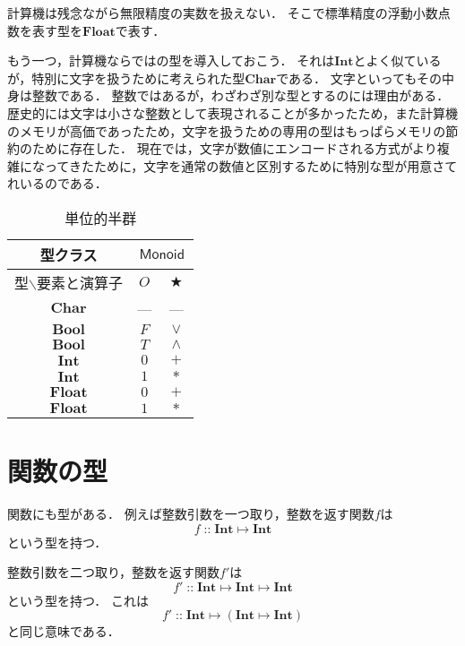 \documentclass[twocolumn]{jsbook}
\newcommand{\hsklType}[1]{\textbf{#1}}
\newcommand{\hsklTypeclass}[1]{\mathsf{#1}}
\newcommand{\hsklBool}{\hsklType{Bool}}
\newcommand{\hsklChar}{\hsklType{Char}}
\newcommand{\hsklInt}{\hsklType{Int}}
\newcommand{\hsklFloat}{\hsklType{Float}}
\newcommand{\hsklMonoid}{\hsklTypeclass{Monoid}}
\DeclareMathOperator{\mathAnyBinaryOperator}{\bigstar}
\DeclareMathOperator{\mathIn}{::}
\DeclareMathOperator{\mathMapsTo}{\mapsto}
\newcommand{\mathMorph}[2]{#1\mathMapsTo#2}
\newcommand{\mathMorphII}[3]{#1\mathMapsTo#2\mathMapsTo#3}
\newcommand{\mathMorphIIWithParenthesis}[3]{#1\mathMapsTo(#2\mathMapsTo#3)}
\newcommand{\typename}[1]{\mathbf{#1}}
\newcommand{\typechar}{\typename{Char}}
\begin{document}
計算機は残念ながら無限精度の実数を扱えない．
そこで標準精度の浮動小数点数を表す型を$\hsklFloat$で表す．

もう一つ，計算機ならではの型を導入しておこう．
それは$\hsklInt$とよく似ているが，特別に文字を扱うために考えられた型$\hsklChar$である．
文字といってもその中身は整数である．
整数ではあるが，わざわざ別な型とするのには理由がある．
歴史的には文字は小さな整数として表現されることが多かったため，また計算機のメモリが高価であったため，文字を扱うための専用の型はもっぱらメモリの節約のために存在した．
現在では，文字が数値にエンコードされる方式がより複雑になってきたために，文字を通常の数値と区別するために特別な型が用意さてれいるのである．

\begin{table}
\caption{単位的半群}
\label{tab:monoids}
\begin{center}
\begin{tabular}{||c||c|c||}
\hline
型クラス
    &\multicolumn{2}{|c||}{$\hsklMonoid$}\\
\hline\hline
型$\backslash$要素と演算子
    &$O$
    &$\mathAnyBinaryOperator$\\
\hline
$\typechar$
    &---
    &---\\
\hline
$\hsklBool$
    &$F$
    &$\vee$\\
\hline
$\hsklBool$
    &$T$
    &$\wedge$\\
\hline
$\hsklInt$
    &$0$
    &$+$\\
\hline
$\hsklInt$
    &$1$
    &$*$\\
\hline
$\hsklFloat$
    &$0$
    &$+$\\
\hline
$\hsklFloat$
    &$1$
    &$*$\\
\hline
\end{tabular}
\end{center}
\end{table}

\section{関数の型}

関数にも型がある．
例えば整数引数を一つ取り，整数を返す関数$f$は$$f\mathIn\mathMorph{\hsklInt}{\hsklInt}$$という型を持つ．

整数引数を二つ取り，整数を返す関数$f'$は$$f'\mathIn\mathMorphII{\hsklInt}{\hsklInt}{\hsklInt}$$という型を持つ．
これは$$f'\mathIn\mathMorphIIWithParenthesis{\hsklInt}{\hsklInt}{\hsklInt}$$と同じ意味である．
\end{document}
